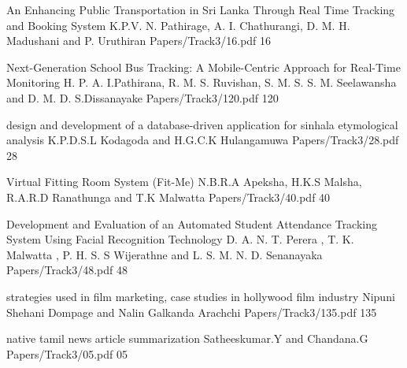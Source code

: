





   \addpaper
    	{An Enhancing Public Transportation in Sri Lanka Through Real Time Tracking and Booking System}
   		 {K.P.V. N. Pathirage, A. I. Chathurangi, D. M. H. Madushani and P. Uruthiran} 
   		 {Papers/Track3/16.pdf}
        {16}




    \addpaper
    	{Next-Generation School Bus Tracking: A Mobile-Centric Approach for Real-Time Monitoring}
   		 {H. P. A. I.Pathirana, R. M. S. Ruvishan, S. M. S. S. M. Seelawansha and D. M. D. S.Dissanayake} 
   		 {Papers/Track3/120.pdf}
        {120}

    \addpaper
    	{design and development of a database-driven application for sinhala etymological analysis}
   		 {K.P.D.S.L Kodagoda and H.G.C.K Hulangamuwa} 
   		 {Papers/Track3/28.pdf}
        {28}

    \addpaper
    	{Virtual Fitting Room System (Fit-Me)}
   		 {N.B.R.A Apeksha, H.K.S Malsha, R.A.R.D Ranathunga and
T.K Malwatta} 
   		 {Papers/Track3/40.pdf}
        {40}

    \addpaper
    	{Development and Evaluation of an Automated Student Attendance Tracking System Using Facial Recognition Technology}
   		 {D. A. N. T. Perera , T. K. Malwatta , P. H. S. S Wijerathne and L. S. M. N. D.
Senanayaka} 
   		 {Papers/Track3/48.pdf}
        {48}

    \addpaper
    	{strategies used in film marketing, case studies in hollywood film industry}
   		 {Nipuni Shehani Dompage and Nalin Galkanda Arachchi} 
   		 {Papers/Track3/135.pdf}
        {135}

    \addpaper
    	{native tamil news article summarization}
   		 {Satheeskumar.Y and Chandana.G} 
   		 {Papers/Track3/05.pdf}
        {05}